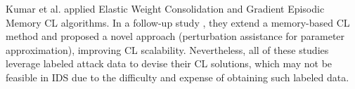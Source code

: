 Kumar et al.\cite{amalapuram2022continual} applied Elastic Weight Consolidation and Gradient Episodic Memory CL algorithms. In a follow-up study \cite{kumar2023augmented}, they extend a memory-based CL method and proposed a novel approach (perturbation assistance for parameter approximation), improving CL scalability. Nevertheless, all of these studies leverage labeled attack data to devise their CL solutions, which may not be feasible in IDS due to the difficulty and expense of obtaining such labeled data.     
   

